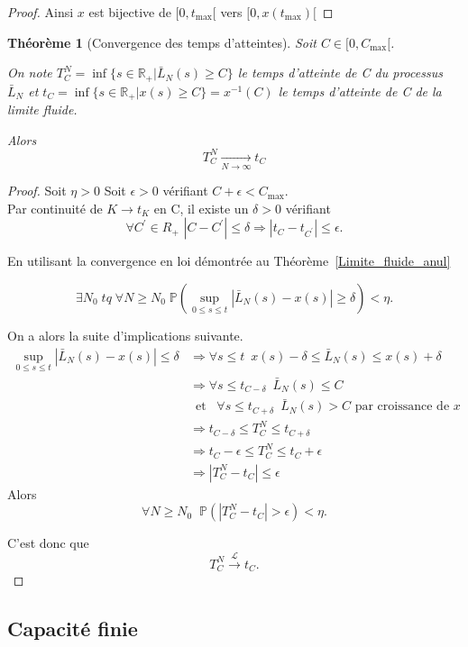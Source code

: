 \documentclass[12pt,a4paper]{article}
\newcommand{\R}{\mathbb{R}}
\newcommand{\1}[1]{\mathbbm{1}_{\{#1\}} }
\newtheorem{theorem}{Théorème}
\theoremstyle{definition}
\begin{document}
{\begin{proof}
Ainsi $x$ est bijective de $[0,t_{\max}[$ vers $[0,x(t_{\max})[$
\end{proof}


\begin{theorem}[Convergence des temps d'atteintes]
Soit $C \in [0,C_{\max}[$.

On note $T_C^N = \inf\{s\in \R_+ | \bar{L}_N(s) \geq C\}$ le temps d'atteinte de C du processus $\bar{L}_N$ et $t_C = \inf\{s\in \R_+ | x(s) \geq C\} = x^{-1}(C)$ le temps d'atteinte de C de la limite fluide.

Alors $$T_C^N\underset{N\to\infty}{\to}t_C$$
\end{theorem}

\begin{proof}
Soit $\eta>0$
Soit $\epsilon > 0$ vérifiant $C+\epsilon < C_{\max}$.\\

Par continuité de $K \to t_K$ en C, il existe un $\delta > 0$ vérifiant $$\forall C^{'} \in R_+\,\,|C-C^{'}|\leq\delta \Rightarrow |t_C-t_{C^{'}}| \leq \epsilon.$$



En utilisant la convergence en loi démontrée au Théorème~\ref{Limite_fluide_anul}

$$\exists N_0\; tq\; \forall N \geq N_0\; \mathbb{P}\left(\underset{0\leq s \leq t}{\sup} |\bar{L}_N(s) - x(s)| \geq \delta \right) < \eta.$$

On a alors la suite d'implications suivante.
\begin{align*}
\underset{0\leq s \leq t}{\sup} |\bar{L}_N(s) - x(s)| \leq \delta &\Rightarrow \forall s \leq t \,\,\, x(s) - \delta\leq\bar{L}_N(s) \leq x(s) + \delta\\
&\Rightarrow  \forall s \leq t_{C-\delta}\,\,\, \bar{L}_N(s) \leq C\\
&\,\,\,\text{et}\,\,\,\,\,  \forall s \leq t_{C+\delta}\,\,\, \bar{L}_N(s) > C    \text{ par croissance de $x$}\\
&\Rightarrow  t_{C-\delta} \leq T_C^N \leq t_{C+\delta}\\
&\Rightarrow  t_{C}-\epsilon \leq T_C^N \leq t_{C}+\epsilon\\
&\Rightarrow  |T_C^N-t_C| \leq \epsilon
\end{align*} 
Alors $$\forall N \geq N_0\;\; \mathbb{P}\left(|T_C^N-t_C| > \epsilon\right) <\eta.$$

C'est donc que $$T_C^N \overset{\mathcal{L}}{\to} t_C.$$
\end{proof}

\subsection{Capacité finie}

}
\end{document}
